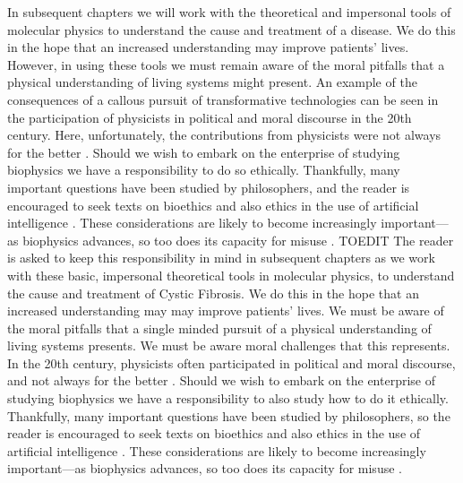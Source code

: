 In subsequent chapters we will work with the theoretical and impersonal tools of molecular physics to understand the cause and treatment of a disease. We do this in the hope that an increased understanding may improve patients' lives. However, in using these tools we must remain aware of the moral pitfalls that a physical understanding of living systems might present. An example of the consequences of a callous pursuit of transformative technologies can be seen in the participation of physicists in political and moral discourse in the 20th century. Here, unfortunately, the contributions from physicists were not always for the better \cite{frank1993, gottfried1999, global2009, rhodes1986, aaronson2008, berger2016, vonneumann_britanica}. Should we wish to embark on the enterprise of studying biophysics we have a responsibility to do so ethically. Thankfully, many important questions have been studied by philosophers, and the reader is encouraged to seek texts on bioethics and also ethics in the use of artificial intelligence \cite{buchanan2000, taneri2011, genome_editting_guildelines_2017, muller2021, bostrom2014}. These considerations are likely to become increasingly important---as biophysics advances, so too does its capacity for misuse \cite{mallapaty2022, urbina2022}. 
TOEDIT The reader is asked to keep this responsibility in mind in subsequent chapters as we work with these basic, impersonal theoretical tools in molecular physics, to understand the cause and treatment of Cystic Fibrosis. We do this in the hope that an increased understanding may may improve patients' lives. We must be aware of the moral pitfalls that a single minded pursuit of a physical understanding of living systems presents. We must be aware moral challenges that this represents. In the 20th century, physicists often participated in political and moral discourse, and not always for the better \cite{frank1993, gottfried1999, global2009, rhodes1986, aaronson2008, berger2016, vonneumann_britanica}. Should we wish to embark on the enterprise of studying biophysics we have a responsibility to also study how to do it ethically. Thankfully, many important questions have been studied by philosophers, so the reader is encouraged to seek texts on bioethics and also ethics in the use of artificial intelligence \cite{buchanan2000, taneri2011, genome_editting_guildelines_2017, muller2021, bostrom2014}. These considerations are likely to become increasingly important---as biophysics advances, so too does its capacity for misuse \cite{mallapaty2022, urbina2022}. 


